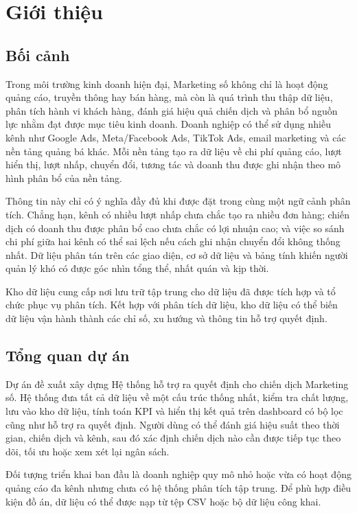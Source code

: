 \section{Giới thiệu}
\subsection{Bối cảnh}
Trong môi trường kinh doanh hiện đại, Marketing số không chỉ là hoạt động quảng cáo, truyền thông hay bán hàng, mà còn là quá trình thu thập dữ liệu, phân tích hành vi khách hàng, đánh giá hiệu quả chiến dịch và phân bổ nguồn lực nhằm đạt được mục tiêu kinh doanh. Doanh nghiệp có thể sử dụng nhiều kênh như Google Ads, Meta/Facebook Ads, TikTok Ads, email marketing và các nền tảng quảng bá khác. Mỗi nền tảng tạo ra dữ liệu về chi phí quảng cáo, lượt hiển thị, lượt nhấp, chuyển đổi, tương tác và doanh thu được ghi nhận theo mô hình phân bổ của nền tảng.\medskip

Thông tin này chỉ có ý nghĩa đầy đủ khi được đặt trong cùng một ngữ cảnh phân tích. Chẳng hạn, kênh có nhiều lượt nhấp chưa chắc tạo ra nhiều đơn hàng; chiến dịch có doanh thu được phân bổ cao chưa chắc có lợi nhuận cao; và việc so sánh chi phí giữa hai kênh có thể sai lệch nếu cách ghi nhận chuyển đổi không thống  nhất. Dữ liệu phân tán trên các giao diện, cơ sở dữ liệu và bảng tính khiến người quản lý khó có được góc nhìn tổng thể, nhất quán và kịp thời.\medskip

Kho dữ liệu cung cấp nơi lưu trữ tập trung cho dữ liệu đã được tích hợp và tổ chức phục vụ phân tích. Kết hợp với phân tích dữ liệu, kho dữ liệu có thể biến dữ liệu vận hành thành các chỉ số, xu hướng và thông tin hỗ trợ quyết định.


\subsection{Tổng quan dự án}
Dự án đề xuất xây dựng Hệ thống hỗ trợ ra quyết định cho chiến dịch Marketing số. Hệ thống đưa tất cả dữ liệu về một cấu trúc thống nhất, kiểm tra chất lượng, lưu vào kho dữ liệu, tính toán KPI và hiển thị kết quả trên dashboard có bộ lọc cũng như hỗ trợ ra quyết định. Người dùng có thể đánh giá hiệu suất theo thời gian, chiến dịch và kênh, sau đó xác định chiến dịch nào cần được tiếp tục theo dõi, tối ưu hoặc xem xét lại ngân sách.\medskip

Đối tượng triển khai ban đầu là doanh nghiệp quy mô nhỏ hoặc vừa có hoạt động quảng cáo đa kênh nhưng
chưa có hệ thống phân tích tập trung. Để phù hợp điều kiện đồ án, dữ liệu có thể được nạp từ tệp CSV hoặc bộ
dữ liệu công khai.


